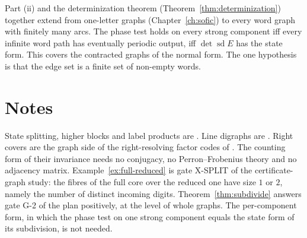 Part (ii) and the determinization theorem (Theorem~\ref{thm:determinization}) together extend
\cite[Thm.~21]{Oda26} from one-letter graphs (Chapter~\ref{ch:sofic}) to every word graph with
finitely many arcs. The phase test holds on
every strong component iff every infinite word path has eventually periodic output, iff
\(\det\operatorname{sd}E\) has the state form. This covers the contracted graphs of the normal
form. The one hypothesis is that the edge set is a finite set of non-empty words.

\section*{Notes}
State splitting, higher blocks and label products are \cite[§§2.3, 2.4, 3.4]{LM95}. Line
digraphs are \cite[§4.5]{BJG09}. Right covers are the graph side of the right-resolving factor
codes of \cite[ch.~8]{LM95}. The counting form of their invariance needs no conjugacy, no
Perron--Frobenius theory and no adjacency matrix. Example~\ref{ex:full-reduced} is gate X-SPLIT
of the certificate-graph study: the fibres of the full core over the reduced one have size
\(1\) or \(2\), namely the number of distinct incoming digits. Theorem~\ref{thm:subdivide}
answers gate G-2 of the plan positively, at the level of whole graphs. The per-component form,
in which the phase test on one strong component equals the state form of its subdivision, is
not needed.

